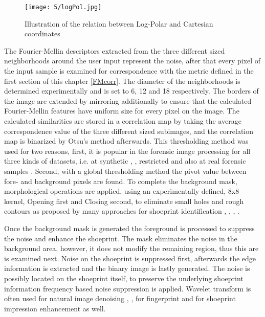 \documentclass[draft,final]{vutinfth} %
\begin{document}
\begin{figure}[h]
  \centering
  \texttt{[image: 5/logPol.jpg]}
  \caption{Illustration of the relation between Log-Polar and Cartesian coordinates \cite{sarvaiya2012image}}
  \label{fig:sans:logPol} %
\end{figure}

\par
The Fourier-Mellin descriptors extracted from the three different sized neighborhoods around the user input represent the noise, after that every pixel of the input sample is examined for correspondence with the metric defined in the first section of this chapter \ref{FMcorr}.
The diameter of the neighborhoods is determined experimentally and is set to 6, 12 and 18 respectively.
The borders of the image are extended by mirroring additionally to ensure that the calculated Fourier-Mellin features have uniform size for every pixel on the image.
The calculated similarities are stored in a correlation map by taking the average correspondence value of the three different sized subimages, and the correlation map is binarized by Otsu's method afterwards.
This thresholding method was used for two reasons, first, it is popular in the forensic image processing for all three kinds of datasets, i.e. at synthetic \cite{algarni2008novel}, \cite{alizadeh2017automatic}, restricted \cite{kong2014novel} and also at real forensic samples \cite{wu2019crime}.
Second, with a global thresholding method the pivot value between fore- and background pixels are found.
To complete the background mask, morphological operations are applied, using an experimentally defined, 8x8 kernel, Opening first and Closing second, to eliminate small holes and rough contours as proposed by many approaches for shoeprint identification \cite{wang2014automatic}, \cite{kong2014novel}, \cite{li2014retrieval}, \cite{tang2010footwear}.
\par
Once the background mask is generated the foreground is processed to suppress the noise and enhance the shoeprint.
The mask eliminates the noise in the background area, however, it does not modify the remaining region, thus this are is examined next.
Noise on the shoeprint is suppressed first, afterwards the edge information is extracted and the binary image is lastly generated.
The noise is possibly located on the shoeprint itself, to preserve the underlying shoeprint information frequency based noise suppression is applied.
Wavelet transform is often used for natural image denoising \cite{xu2016image}, \cite{sugamya2016image}, for fingerprint \cite{li2012texture} and for shoeprint impression enhancement \cite{katireddy2017novel} as well.
\end{document}
